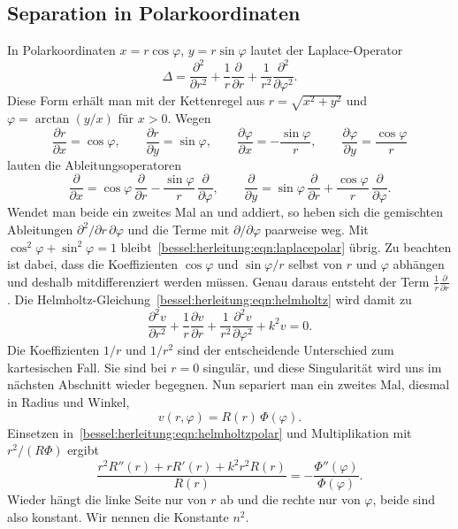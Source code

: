 \subsection{Separation in Polarkoordinaten
\label{bessel:herleitung:subsection:polar}}
In Polarkoordinaten $x=r\cos\varphi$, $y=r\sin\varphi$ lautet der Laplace-Operator
%
%
\begin{equation}
\Delta
=
\frac{\partial^2}{\partial r^2}
+
\frac{1}{r}\frac{\partial}{\partial r}
+
\frac{1}{r^2}\frac{\partial^2}{\partial\varphi^2}.
\label{bessel:herleitung:eqn:laplacepolar}
\end{equation}
Diese Form erhält man mit der Kettenregel aus $r=\sqrt{x^2+y^2}$ und $\varphi=\arctan(y/x)$ für $x>0$.
Wegen
\[
\frac{\partial r}{\partial x} = \cos\varphi,
\qquad
\frac{\partial r}{\partial y} = \sin\varphi,
\qquad
\frac{\partial\varphi}{\partial x} = -\frac{\sin\varphi}{r},
\qquad
\frac{\partial\varphi}{\partial y} = \frac{\cos\varphi}{r}
\]
lauten die Ableitungsoperatoren
\[
\frac{\partial}{\partial x}
=
\cos\varphi\,\frac{\partial}{\partial r}
-
\frac{\sin\varphi}{r}\,\frac{\partial}{\partial\varphi},
\qquad
\frac{\partial}{\partial y}
=
\sin\varphi\,\frac{\partial}{\partial r}
+
\frac{\cos\varphi}{r}\,\frac{\partial}{\partial\varphi}.
\]
Wendet man beide ein zweites Mal an und addiert, so heben sich die gemischten Ableitungen $\partial^2/\partial r\,\partial\varphi$ und die Terme mit $\partial/\partial\varphi$ paarweise weg.
Mit $\cos^2\varphi+\sin^2\varphi=1$ bleibt~\eqref{bessel:herleitung:eqn:laplacepolar} übrig.
Zu beachten ist dabei, dass die Koeffizienten $\cos\varphi$ und $\sin\varphi/r$ selbst von $r$ und $\varphi$ abhängen und deshalb mitdifferenziert werden müssen.
Genau daraus entsteht der Term $\frac{1}{r}\frac{\partial}{\partial r}$.
Die Helmholtz-Gleichung~\eqref{bessel:herleitung:eqn:helmholtz} wird damit zu
\begin{equation}
\frac{\partial^2 v}{\partial r^2}
+
\frac{1}{r}\frac{\partial v}{\partial r}
+
\frac{1}{r^2}\frac{\partial^2 v}{\partial\varphi^2}
+
k^2 v
=
0.
\label{bessel:herleitung:eqn:helmholtzpolar}
\end{equation}
Die Koeffizienten $1/r$ und $1/r^2$ sind der entscheidende Unterschied zum kartesischen Fall.
Sie sind bei $r=0$ singulär, und diese Singularität wird uns im nächsten Abschnitt wieder begegnen.
Nun separiert man ein zweites Mal, diesmal in Radius und Winkel,
\begin{equation}
v(r,\varphi)
=
R(r)\,\Phi(\varphi).
\label{bessel:herleitung:eqn:radialsep}
\end{equation}
Einsetzen in~\eqref{bessel:herleitung:eqn:helmholtzpolar} und Multiplikation mit $r^2/(R\Phi)$ ergibt
\[
\frac{r^2R''(r) + rR'(r) + k^2r^2R(r)}{R(r)}
=
-\frac{\Phi''(\varphi)}{\Phi(\varphi)}.
\]
Wieder hängt die linke Seite nur von $r$ ab und die rechte nur von $\varphi$, beide sind also konstant.
Wir nennen die Konstante $n^2$.

